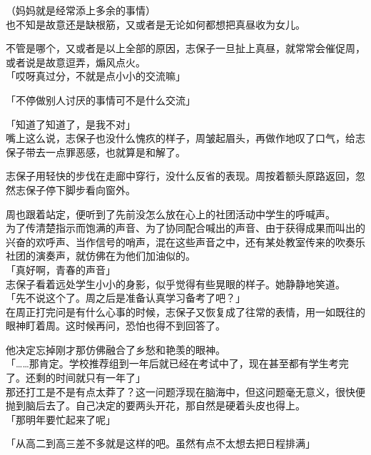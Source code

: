 （妈妈就是经常添上多余的事情）\\

也不知是故意还是缺根筋，又或者是无论如何都想把真昼收为女儿。

不管是哪个，又或者是以上全部的原因，志保子一旦扯上真昼，就常常会催促周，或者说是故意逗弄，煽风点火。\\

「哎呀真过分，不就是点小小的交流嘛」

「不停做别人讨厌的事情可不是什么交流」

「知道了知道了，是我不对」\\

嘴上这么说，志保子也没什么愧疚的样子，周皱起眉头，再做作地叹了口气，给志保子带去一点罪恶感，也就算是和解了。

志保子用轻快的步伐在走廊中穿行，没什么反省的表现。周按着额头原路返回，忽然志保子停下脚步看向窗外。

周也跟着站定，便听到了先前没怎么放在心上的社团活动中学生的呼喊声。\\

为了传清楚指示而饱满的声音、为了协同配合喊出的声音、由于获得成果而叫出的兴奋的欢呼声、当作信号的哨声，混在这些声音之中，还有某处教室传来的吹奏乐社团的演奏声，就仿佛在为他们加油似的。\\

「真好啊，青春的声音」\\

志保子看着远处学生小小的身影，似乎觉得有些晃眼的样子。她静静地笑道。\\

「先不说这个了。周之后是准备认真学习备考了吧？」\\

在周正打完问是有什么心事的时候，志保子又恢复成了往常的表情，用一如既往的眼神盯着周。这时候再问，恐怕也得不到回答了。

他决定忘掉刚才那仿佛融合了乡愁和艳羡的眼神。\\

「……那肯定。学校推荐组到一年后就已经在考试中了，现在甚至都有学生考完了。还剩的时间就只有一年了」\\

那还打工是不是有点太莽了？这一问题浮现在脑海中，但这问题毫无意义，很快便抛到脑后去了。自己决定的要两头开花，那自然是硬着头皮也得上。\\

「那明年要忙起来了呢」

「从高二到高三差不多就是这样的吧。虽然有点不太想去把日程排满」

